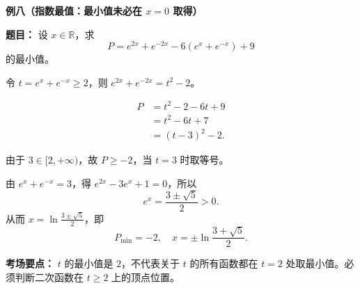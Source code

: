 \begin{examplebox}
\textbf{\textcolor{CExample}{例八（指数最值：最小值未必在 $x=0$ 取得）}}

\textbf{题目：} 设 $x\in\mathbb R$，求
\[
P=e^{2x}+e^{-2x}-6(e^x+e^{-x})+9
\]
的最小值。
\begin{description}[style=nextline,leftmargin=2.8em,labelsep=0.5em,itemsep=0.45em]
\item[\textbf{第一步（整体换元，带上范围）：}]
令 $t=e^x+e^{-x}\ge2$，则 $e^{2x}+e^{-2x}=t^2-2$。
\item[\textbf{第二步（化为二次函数）：}]
\[
\begin{aligned}
P&=t^2-2-6t+9\\
&=t^2-6t+7\\
&=(t-3)^2-2.
\end{aligned}
\]
\item[\textbf{第三步（检查顶点是否可取）：}]
由于 $3\in[2,+\infty)$，故 $P\ge-2$，当 $t=3$ 时取等号。

\item[\textbf{第四步（找出取等的原变量）：}]
由 $e^x+e^{-x}=3$，得 $e^{2x}-3e^x+1=0$，所以
\[
e^x=\frac{3\pm\sqrt5}2>0.
\]
从而 $x=\ln\frac{3\pm\sqrt5}2$，即
\[
\boxed{P_{\min}=-2,\quad x=\pm\ln\frac{3+\sqrt5}2}.
\]
\end{description}
\textbf{考场要点：} $t$ 的最小值是 $2$，不代表关于 $t$ 的所有函数都在 $t=2$ 处取最小值。必须判断二次函数在 $t\ge2$ 上的顶点位置。
\end{examplebox}
\clearpage
